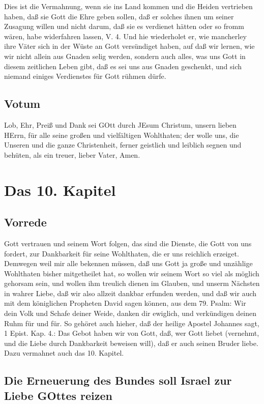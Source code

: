 Dies ist die Vermahnung, wenn sie ins Land kommen und die Heiden vertrieben haben, daß sie Gott die Ehre geben sollen, daß er solches ihnen um seiner Zusagung willen und nicht darum, daß sie es verdienet hätten oder so fromm wären, habe widerfahren lassen, V. 4. Und hie wiederholet er, wie mancherley ihre Väter sich in der Wüste an Gott versündiget haben, auf daß wir lernen, wie wir nicht allein aus Gnaden selig werden, sondern auch alles, was uns Gott in diesem zeitlichen Leben gibt, daß es sei uns aus Gnaden geschenkt, und sich niemand einiges Verdienstes für Gott rühmen dürfe.

\section{Votum}

Lob, Ehr, Preiß und Dank sei GOtt durch JEsum Christum, unsern lieben HErrn, für alle seine großen und vielfältigen Wohlthaten; der wolle uns, die Unseren und die ganze Christenheit, ferner geistlich und leiblich segnen und behüten, als ein treuer, lieber Vater, Amen.

\chapter{Das 10. Kapitel}

\section{Vorrede}

Gott vertrauen und seinem Wort folgen, das sind die Dienste, die Gott von uns fordert, zur Dankbarkeit für seine Wohlthaten, die er
uns reichlich erzeiget. Demwegen weil mir alle bekennen müssen, daß uns Gott ja große und unzählige Wohlthaten bisher mitgetheilet hat, so wollen wir seinem Wort so viel als möglich gehorsam sein, und wollen ihm treulich dienen im Glauben, und unserm Nächsten in wahrer Liebe, daß wir also allzeit dankbar erfunden werden, und daß wir auch mit dem königlichen Propheten David sagen können, aus dem 79. Psalm: Wir dein Volk und Schafe deiner Weide, danken dir ewiglich, und verkündigen deinen Ruhm für und für. So gehöret auch hieher, daß der heilige Apostel Johannes sagt, 1 Epist. Kap. 4.: Das Gebot haben wir von Gott, daß, wer Gott liebet (vernehmt, und die Liebe durch Dankbarkeit beweisen will), daß er auch seinen Bruder liebe. Dazu vermahnet auch das 10. Kapitel.

\section[Die Erneuerung des Bundes soll Israel zur Liebe]{Die Erneuerung des Bundes soll Israel zur Liebe GOttes reizen}


